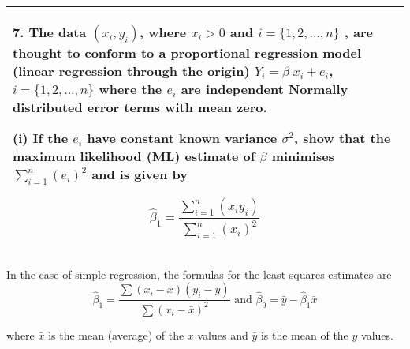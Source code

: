 \documentclass[a4paper,12pt]{article}
\begin{document}
\begin{table}[ht!]
     \centering
     \begin{tabular}{|p{15cm}|}
     \hline        
7. The data $( x_i, y_i)$, where $x_i>0$  and  $i = \{1 ,2, \ldots,n\}$ , are thought to conform to a proportional regression model (linear regression through the origin)
$Y_i = \beta\;x_i + e_i$, $i = \{1 ,2, \ldots,n\}$
where the $e_i$ are independent Normally distributed error terms with mean zero.


(i) If the $e_i$ have constant known variance 
$\sigma^2$, show that the maximum likelihood (ML)
estimate of 
$\beta$
 minimises $ \sum^n_{i=1}(e_i)^2$ and is given by
 
 {
 \large
 \[ \hat{\beta}_{1} = \frac{\sum^n_{i=1}(x_i y_i)}{\sum^n_{i=1}(x_i)^2}  \]
}

\\ \hline
      \end{tabular}
    \end{table}
    

    


\begin{framed}
In the case of simple regression, the formulas for the least squares estimates are 
\[{\displaystyle {\widehat {\beta }}_{1}={\frac {\sum (x_{i}-{\bar {x}})(y_{i}-{\bar {y}})}{\sum (x_{i}-{\bar {x}})^{2}}}{\text{ and }}{\widehat {\beta }}_{0}={\bar {y}}-{\widehat {\beta }}_{1}{\bar {x}}} \]

where 
$ {\displaystyle {\bar {x}}} $
 is the mean (average) of the 
$ {\displaystyle x} $
 values and 
${\displaystyle {\bar {y}}}$ 
 is the mean of the 
$ {\displaystyle y} $
 values.

\end{framed}
\end{document}
